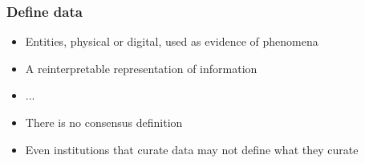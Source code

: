 \documentclass{beamer}
\begin{document}
{
	\begin{frame}[plain]
	\vspace{6cm}
	\end{frame}
}

\begin{frame}
  \frametitle{Define data}
  
  \begin{itemize}
  \item Entities, physical or digital, used as evidence of phenomena \cite{borgman15big}
  \item A reinterpretable representation of information \cite{ccsds12oais}
  \item ...
  \item There is no consensus definition
  \item Even institutions that curate data may not define what they curate
  \end{itemize}
\end{frame}
\end{document}
